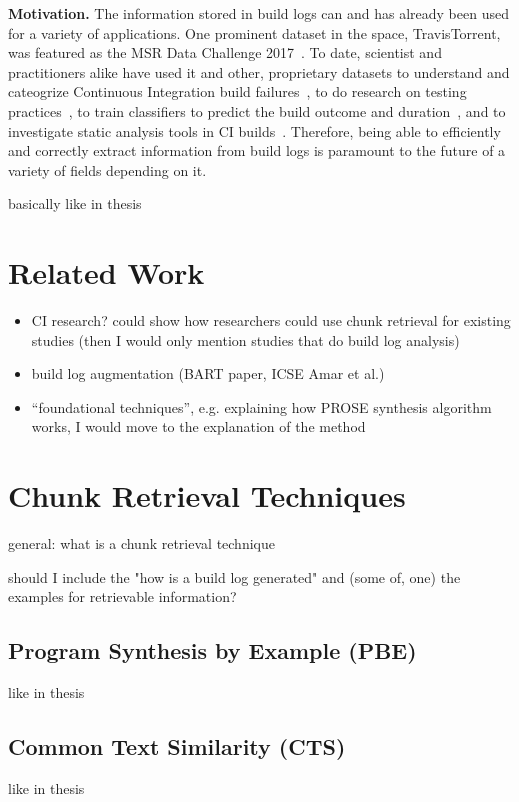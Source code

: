 

\textbf{Motivation.} The information stored in build logs can and has
already been used for a variety of applications. One prominent dataset
in the space, TravisTorrent, was featured as the MSR Data Challenge
2017~\cite{msr17challenge}. To date, scientist and practitioners alike
have used it and other, proprietary datasets to understand and
cateogrize Continuous Integration build
failures~\cite{islam2017insights}, to do research on testing
practices~\cite{orellana2017differences}, to train classifiers to
predict the build outcome and
duration~\cite{ni2017cost,bisong2017built,machalica2019predictive},
and to investigate static analysis tools in CI
builds~\cite{zampetti2017open}. Therefore, being able to efficiently
and correctly extract information from build logs is paramount to the
future of a variety of fields depending on it.

basically like in thesis

\section{Related Work}
\begin{itemize}
	\item CI research? could show how researchers could use chunk retrieval for existing studies (then I would only mention studies that do build log analysis)
	\item build log augmentation (BART paper, ICSE Amar et al.)
	\item ``foundational techniques'', e.g. explaining how PROSE synthesis algorithm works, I would move to the explanation of the method
\end{itemize}

\section{Chunk Retrieval Techniques}
general: what is a chunk retrieval technique

should I include the "how is a build log generated" and (some of, one) the examples for retrievable information?

\subsection{Program Synthesis by Example (PBE)}
like in thesis
\subsection{Common Text Similarity (CTS)}
like in thesis

